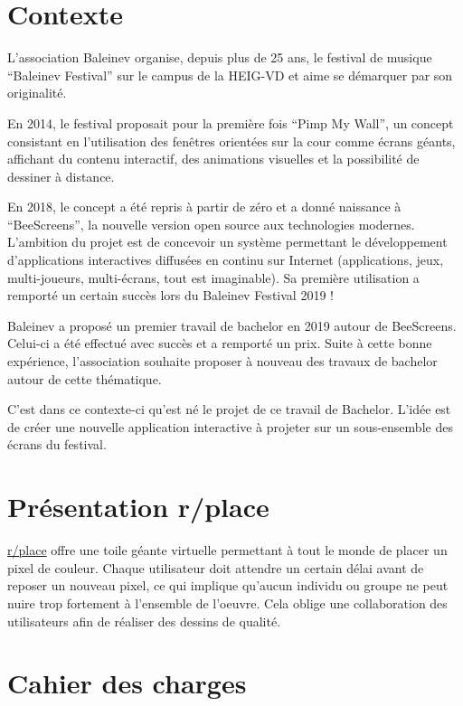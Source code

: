 \section{Contexte}
L'association Baleinev organise, depuis plus de 25 ans, le festival de musique “Baleinev Festival” sur le campus de la HEIG-VD et aime se démarquer par son originalité.

En 2014, le festival proposait pour la première fois “Pimp My Wall”, un concept consistant en l'utilisation des fenêtres orientées sur la cour comme écrans géants, affichant du contenu interactif, des animations visuelles et la possibilité de dessiner à distance.

En 2018, le concept a été repris à partir de zéro et a donné naissance à “BeeScreens”, la nouvelle version open source aux technologies modernes. L'ambition du projet est de concevoir un système permettant le développement d'applications interactives diffusées en continu sur Internet (applications, jeux, multi-joueurs, multi-écrans, tout est imaginable). Sa première utilisation a remporté un certain succès lors du Baleinev Festival 2019 !

Baleinev a proposé un premier travail de bachelor en 2019 autour de BeeScreens. Celui-ci a été effectué avec succès et a remporté un prix. Suite à cette bonne expérience, l'association souhaite proposer à nouveau des travaux de bachelor autour de cette thématique.

C'est dans ce contexte-ci qu'est né le projet de ce travail de Bachelor. L'idée est de créer une nouvelle application interactive à projeter sur un sous-ensemble des écrans du festival.

\section{Présentation r/place}

\href{https://www.reddit.com/r/place/}{r/place} offre une toile géante virtuelle permettant à tout le monde de placer un pixel de couleur. Chaque utilisateur doit attendre un certain délai avant de reposer un nouveau pixel, ce qui implique qu'aucun individu ou groupe ne peut nuire trop fortement à l'ensemble de l'oeuvre. Cela oblige une collaboration des utilisateurs afin de réaliser des dessins de qualité.

\section{Cahier des charges}

